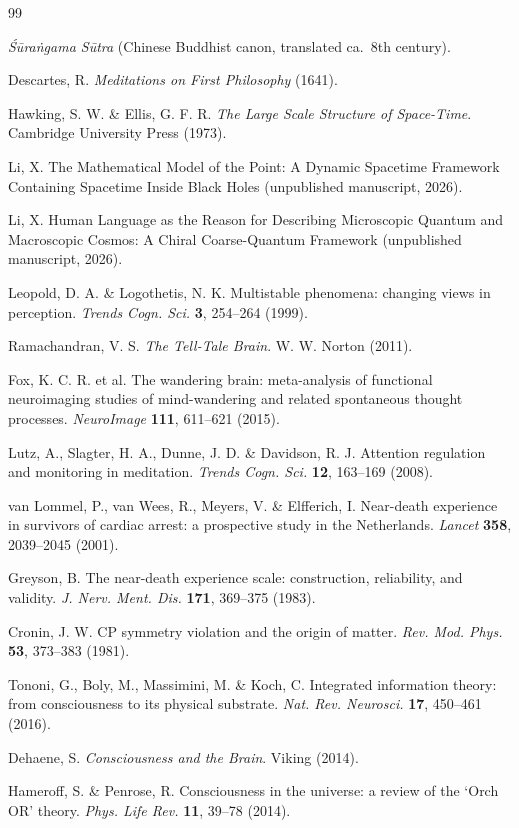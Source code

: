\documentclass[11pt,a4paper]{article}
\begin{document}
\begin{thebibliography}{99}

\textit{Śūraṅgama Sūtra} (Chinese Buddhist canon, translated ca.~8th century).

Descartes, R. \textit{Meditations on First Philosophy} (1641).

Hawking, S. W. \& Ellis, G. F. R. \textit{The Large Scale Structure of Space-Time}. Cambridge University Press (1973).

Li, X. The Mathematical Model of the Point: A Dynamic Spacetime Framework Containing Spacetime Inside Black Holes (unpublished manuscript, 2026).

Li, X. Human Language as the Reason for Describing Microscopic Quantum and Macroscopic Cosmos: A Chiral Coarse-Quantum Framework (unpublished manuscript, 2026).

Leopold, D. A. \& Logothetis, N. K. Multistable phenomena: changing views in perception. \textit{Trends Cogn. Sci.} \textbf{3}, 254--264 (1999).

Ramachandran, V. S. \textit{The Tell-Tale Brain}. W. W. Norton (2011).

Fox, K. C. R. et al. The wandering brain: meta-analysis of functional neuroimaging studies of mind-wandering and related spontaneous thought processes. \textit{NeuroImage} \textbf{111}, 611--621 (2015).

Lutz, A., Slagter, H. A., Dunne, J. D. \& Davidson, R. J. Attention regulation and monitoring in meditation. \textit{Trends Cogn. Sci.} \textbf{12}, 163--169 (2008).

van Lommel, P., van Wees, R., Meyers, V. \& Elfferich, I. Near-death experience in survivors of cardiac arrest: a prospective study in the Netherlands. \textit{Lancet} \textbf{358}, 2039--2045 (2001).

Greyson, B. The near-death experience scale: construction, reliability, and validity. \textit{J. Nerv. Ment. Dis.} \textbf{171}, 369--375 (1983).

Cronin, J. W. CP symmetry violation and the origin of matter. \textit{Rev. Mod. Phys.} \textbf{53}, 373--383 (1981).

Tononi, G., Boly, M., Massimini, M. \& Koch, C. Integrated information theory: from consciousness to its physical substrate. \textit{Nat. Rev. Neurosci.} \textbf{17}, 450--461 (2016).

Dehaene, S. \textit{Consciousness and the Brain}. Viking (2014).

Hameroff, S. \& Penrose, R. Consciousness in the universe: a review of the `Orch OR' theory. \textit{Phys. Life Rev.} \textbf{11}, 39--78 (2014).

\end{thebibliography}
\end{document}
